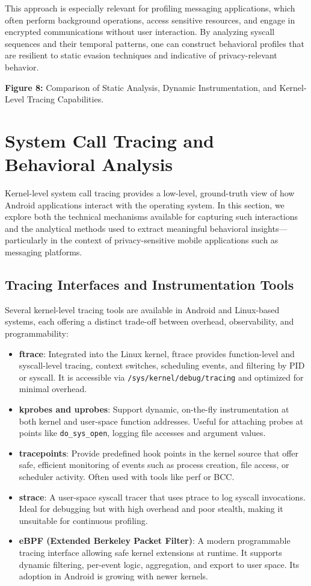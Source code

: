\documentclass[a4paper,12pt]{report}
\begin{document}
This approach is especially relevant for profiling messaging applications, which often perform background operations, access sensitive resources, and engage in encrypted communications without user interaction. By analyzing syscall sequences and their temporal patterns, one can construct behavioral profiles that are resilient to static evasion techniques and indicative of privacy-relevant behavior.

\textbf{Figure 8:} Comparison of Static Analysis, Dynamic Instrumentation, and Kernel-Level Tracing Capabilities.

\section{System Call Tracing and Behavioral Analysis}

Kernel-level system call tracing provides a low-level, ground-truth view of how Android applications interact with the operating system. In this section, we explore both the technical mechanisms available for capturing such interactions and the analytical methods used to extract meaningful behavioral insights—particularly in the context of privacy-sensitive mobile applications such as messaging platforms.

\subsection{Tracing Interfaces and Instrumentation Tools}
Several kernel-level tracing tools are available in Android and Linux-based systems, each offering a distinct trade-off between overhead, observability, and programmability:

\begin{itemize}
\item \textbf{ftrace}: Integrated into the Linux kernel, ftrace provides function-level and syscall-level tracing, context switches, scheduling events, and filtering by PID or syscall. It is accessible via \texttt{/sys/kernel/debug/tracing} and optimized for minimal overhead.
\item \textbf{kprobes and uprobes}: Support dynamic, on-the-fly instrumentation at both kernel and user-space function addresses. Useful for attaching probes at points like \texttt{do\_sys\_open}, logging file accesses and argument values.
\item \textbf{tracepoints}: Provide predefined hook points in the kernel source that offer safe, efficient monitoring of events such as process creation, file access, or scheduler activity. Often used with tools like perf or BCC.
\item \textbf{strace}: A user-space syscall tracer that uses ptrace to log syscall invocations. Ideal for debugging but with high overhead and poor stealth, making it unsuitable for continuous profiling.
\item \textbf{eBPF (Extended Berkeley Packet Filter)}: A modern programmable tracing interface allowing safe kernel extensions at runtime. It supports dynamic filtering, per-event logic, aggregation, and export to user space. Its adoption in Android is growing with newer kernels.
\end{itemize}
\end{document}
